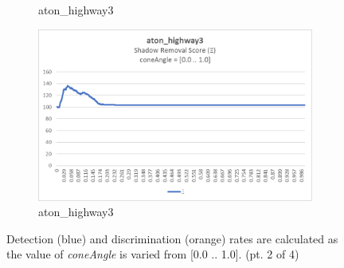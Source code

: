 \begin{appendices}
\begin{figure}
\begin{subfigure}{.45\linewidth}
  \caption{aton\_highway3}
\end{subfigure}
\hfill
\begin{subfigure}{.45\linewidth}
  \includegraphics[width=1\linewidth]{figures/appendix/highway3_coneAngle_score.jpg}
  \caption{aton\_highway3}
\end{subfigure}
\caption{Detection (blue) and discrimination (orange) rates are calculated as the value of \textit{coneAngle} is varied from [0.0 .. 1.0]. (pt. 2 of 4)}

\end{figure}

\begin{figure}


\end{figure}
\end{appendices}
